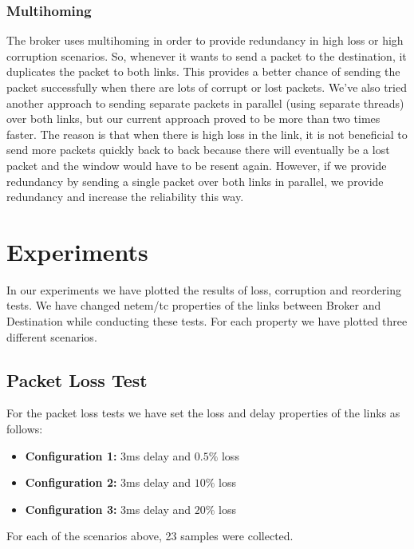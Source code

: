 \documentclass[conference]{IEEEtran}
\begin{document}
\subsubsection{Multihoming}
The broker uses multihoming in order to provide redundancy in high loss or high
corruption scenarios. So, whenever it wants to send a packet to the destination,
it duplicates the packet to both links. This provides a better chance of sending
the packet successfully when there are lots of corrupt or lost packets. We've also
tried another approach to sending separate packets in parallel (using separate threads)
over both links, but our current approach proved to be more than two times faster.
The reason is that when there is high loss in the link, it is not beneficial to
send more packets quickly back to back because there will eventually be a lost packet and
the window would have to be resent again. However, if we provide redundancy by sending a
single packet over both links in parallel, we provide redundancy and increase the
reliability this way.

\section{Experiments}

In our experiments we have plotted the results of loss, corruption and reordering tests. We have changed netem/tc properties of the links between Broker and Destination while conducting these tests.
For each property we have plotted three different scenarios.

\subsection{Packet Loss Test}\label{AA}

For the packet loss tests we have set the loss and delay properties of the links as follows:
\begin{itemize}
    \item \textbf{Configuration 1:} 3ms delay and $0.5\%$ loss
    \item \textbf{Configuration 2:} 3ms delay and $10\%$ loss
    \item \textbf{Configuration 3:} 3ms delay and $20\%$ loss
\end{itemize}
For each of the scenarios above, 23 samples were collected.
\end{document}
